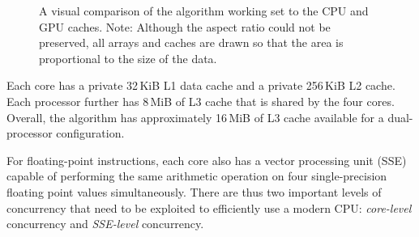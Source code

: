 \begin{figure}
\centering
{}
\label{fig:caches}
\caption{A visual comparison of the algorithm working set to the CPU and GPU
caches.  Note: Although the aspect ratio could not be preserved, all arrays and
caches are drawn so that the area is proportional to the size of the data. } 
\end{figure}

Each core has a private 32\,KiB L1 data cache and a private 256\,KiB L2 cache.
Each processor further has 8\,MiB of L3 cache that is shared by the four cores.
Overall, the algorithm has approximately 16\,MiB of L3 cache
available for a dual-processor configuration.  

For floating-point instructions, each core also has a vector processing unit
(SSE) capable of performing the same arithmetic operation on four single-precision 
floating point values simultaneously.
There are thus two important levels of concurrency that need to be exploited to
efficiently use a modern CPU: {\em core-level} concurrency and {\em SSE-level}
concurrency. 

